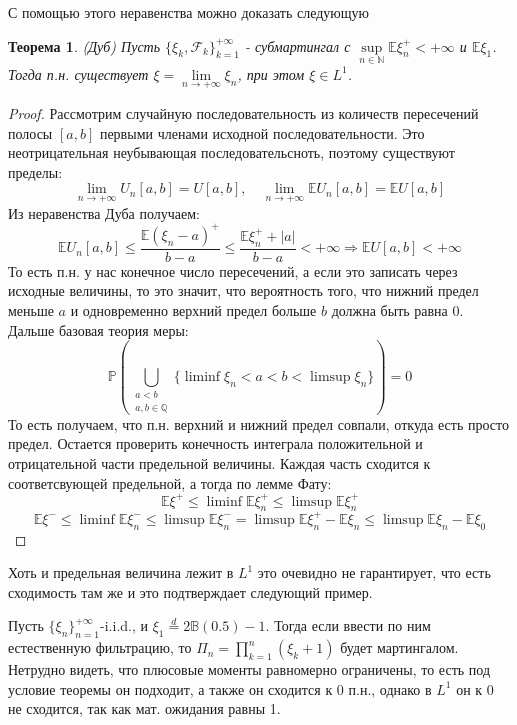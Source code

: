 \documentclass[12pt,a4paper]{article} %
\newtheorem{theorem}{Теорема}
\newcommand{\E}{\mathbb{E}}
\newcommand{\PR}{\mathbb{P}}
\newcommand{\F}{\mathcal{F}}
\begin{document}
	С помощью этого неравенства можно доказать следующую
	\begin{theorem}
		(Дуб) Пусть $\{\xi_k,\F_k\}_{k=1}^{+\infty}$ - субмартингал с $\sup\limits_{n\in\mathbb{N}}\E\xi_n^{+}<+\infty$ и $\E\xi_1$. Тогда п.н. существует $\xi=\lim\limits_{n\rightarrow+\infty}\xi_n$, при этом $\xi\in L^1$.
	\end{theorem}
	\begin{proof}
		Рассмотрим случайную последовательность из количеств пересечений полосы $[a,b]$ первыми членами исходной последовательности. Это неотрицательная неубывающая последовательсноть, поэтому существуют пределы:
		$$\lim\limits_{n\rightarrow+\infty}U_n[a,b]=U[a,b],\quad\lim\limits_{n\rightarrow+\infty}\E U_n[a,b]=\E U[a,b]$$
		Из неравенства Дуба получаем:
		$$\E U_n[a,b]\leq\frac{\E(\xi_n-a)^{+}}{b-a}\leq\frac{\E\xi_n^{+}+|a|}{b-a}<+\infty\Rightarrow\E U[a,b]<+\infty$$
		То есть п.н. у нас конечное число пересечений, а если это записать через исходные величины, то это значит, что вероятность того, что нижний предел меньше $a$ и одновременно верхний предел больше $b$ должна быть равна 0. Дальше базовая теория меры:
		$$\PR\left(\bigcup_{\substack{a<b \\ a,b\in\mathbb{Q}}}\{\liminf\xi_n<a<b<\limsup\xi_n\}\right)=0$$
		То есть получаем, что п.н. верхний и нижний предел совпали, откуда есть просто предел. Остается проверить конечность интеграла положительной и отрицательной части предельной величины. Каждая часть сходится к соответсвующей предельной, а тогда по лемме Фату:
		$$\E\xi^{+}\leq\liminf\E\xi_n^{+}\leq\limsup\E\xi_n^{+}$$
		$$\E\xi^{-}\leq\liminf\E\xi_n^{-}\leq\limsup\E\xi_n^{-}=\limsup\E\xi_n^{+}-\E\xi_n\leq\limsup\E\xi_n-\E\xi_0$$
	\end{proof}
	Хоть и предельная величина лежит в $L^1$ это очевидно не гарантирует, что есть сходимость там же и это подтверждает следующий пример.
	
	Пусть $\{\xi_n\}_{n=1}^{+\infty}$-i.i.d., и $\xi_1\overset{d}{=}2\mathbb{B}(0.5)-1$. Тогда если ввести по ним естественную фильтрацию, то $\Pi_n=\prod_{k=1}^n(\xi_k+1)$ будет мартингалом. Нетрудно видеть, что плюсовые моменты равномерно ограничены, то есть под условие теоремы он подходит, а также он сходится к 0 п.н., однако в $L^1$ он к 0 не сходится, так как мат. ожидания равны 1.
	
\end{document}
